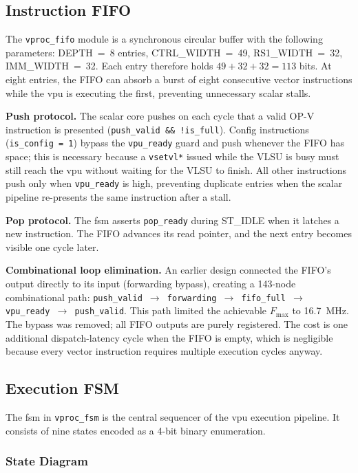 \subsection{Instruction FIFO}
\label{subsec:fifo}

The \texttt{vproc\_fifo} module is a synchronous circular buffer with the following
parameters: DEPTH~=~8 entries, CTRL\_WIDTH~=~49, RS1\_WIDTH~=~32, IMM\_WIDTH~=~32.
Each entry therefore holds $49 + 32 + 32 = 113$ bits. At eight entries, the FIFO
can absorb a burst of eight consecutive vector instructions while the \gls{vpu} is
executing the first, preventing unnecessary scalar stalls.

\textbf{Push protocol.} The scalar core pushes on each cycle that a valid OP-V
instruction is presented (\texttt{push\_valid \&\& !is\_full}). Config instructions
(\texttt{is\_config = 1}) bypass the \texttt{vpu\_ready} guard and push whenever the
FIFO has space; this is necessary because a \texttt{vsetvl*} issued while the VLSU
is busy must still reach the \gls{vpu} without waiting for the VLSU to finish.
All other instructions push only when \texttt{vpu\_ready} is high, preventing
duplicate entries when the scalar pipeline re-presents the same instruction after
a stall.

\textbf{Pop protocol.} The \gls{fsm} asserts \texttt{pop\_ready} during ST\_IDLE when
it latches a new instruction. The FIFO advances its read pointer, and the next entry
becomes visible one cycle later.

\textbf{Combinational loop elimination.} An earlier design connected the FIFO's output
directly to its input (forwarding bypass), creating a 143-node combinational path:
\texttt{push\_valid $\to$ forwarding $\to$ fifo\_full $\to$ vpu\_ready $\to$ push\_valid}.
This path limited the achievable $F_{\max}$ to 16.7~MHz. The bypass was removed; all
FIFO outputs are purely registered. The cost is one additional dispatch-latency cycle
when the FIFO is empty, which is negligible because every vector instruction requires
multiple execution cycles anyway.

\subsection{Execution FSM}
\label{subsec:fsm}

The \gls{fsm} in \texttt{vproc\_fsm} is the central sequencer of the \gls{vpu}
execution pipeline. It consists of nine states encoded as a 4-bit binary enumeration.

\subsubsection{State Diagram}

